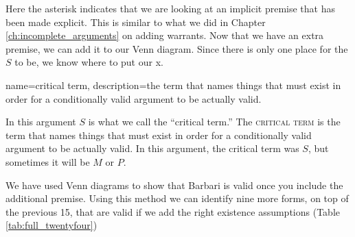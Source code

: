 Here the asterisk indicates that we are looking at an implicit premise that has been made explicit. This is similar to what we did in Chapter \ref{ch:incomplete_arguments} on adding warrants. Now that we have an extra premise, we can add it to our Venn diagram. Since there is only one place for the $S$ to be, we know where to put our x.





{
name=critical term,
description={the term that names things that must exist in order for a conditionally valid argument to be actually valid.}
}

In this argument $S$ is what we call the ``critical term.'' The \textsc{\gls{critical term}}\label{def:critical_term} is the term that names things that must exist in order for a conditionally valid argument to be actually valid. In this argument, the critical term was $S$, but sometimes it will be $M$ or $P$.

We have used Venn diagrams to show that Barbari is valid once you include the additional premise. Using this method we can identify nine more forms, on top of the previous 15, that are valid if we add the right existence assumptions (Table \ref{tab:full_twentyfour})

